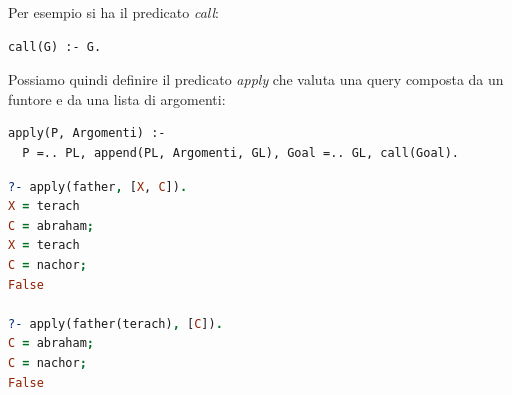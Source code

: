 \documentclass[a4paper]{book}
\begin{document}
Per esempio si ha il predicato \textit{call}:
\begin{verbatim}
call(G) :- G.
\end{verbatim}
Possiamo quindi definire il predicato \textit{apply} che valuta una query composta da un funtore e da una lista di argomenti:
\begin{verbatim}
apply(P, Argomenti) :-
  P =.. PL, append(PL, Argomenti, GL), Goal =.. GL, call(Goal).
\end{verbatim}
\begin{shaded}
\begin{lstlisting}[language=prolog]
?- apply(father, [X, C]).
X = terach
C = abraham;
X = terach
C = nachor;
False

?- apply(father(terach), [C]).
C = abraham;
C = nachor;
False
\end{lstlisting}
\end{shaded}
\end{document}

